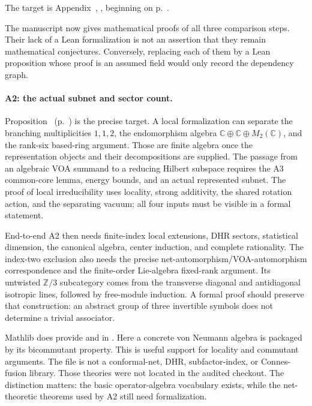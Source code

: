 The target is Appendix~,
\emph{}, beginning on
p.~.

The manuscript now gives mathematical proofs of all three comparison
steps. Their lack of a Lean formalization is not an assertion that they
remain mathematical conjectures. Conversely, replacing each of them
by a Lean proposition whose proof is an assumed field would only record
the dependency graph.

\paragraph{A2: the actual subnet and sector count.}
Proposition~
(p.~) is the precise target.
A local formalization can separate the branching multiplicities
$1,1,2$, the endomorphism algebra
$\mathbb C\oplus\mathbb C\oplus M_2(\mathbb C)$, and the rank-six
based-ring argument. Those are finite algebra once the representation
objects and their decompositions are supplied. The passage from an
algebraic VOA summand to a reducing Hilbert subspace requires the A3
common-core lemma, energy bounds, and an actual represented subnet.
The proof of local irreducibility uses locality, strong additivity,
the shared rotation action, and the separating vacuum; all four inputs
must be visible in a formal statement.

End-to-end A2 then needs finite-index local extensions, DHR sectors,
statistical dimension, the canonical algebra, center induction, and
complete rationality. The index-two exclusion also needs the precise
net-automorphism/VOA-automorphism correspondence and the finite-order
Lie-algebra fixed-rank argument. Its untwisted $\mathbb Z/3$ subcategory
comes from the transverse diagonal and antidiagonal isotropic lines,
followed by free-module induction. A formal proof should preserve that
construction: an abstract group of three invertible symbols does not
determine a trivial associator.

Mathlib does provide  and
 in
.
Here a concrete von Neumann algebra is packaged by its bicommutant
property. This is useful support for locality and commutant arguments.
The file is not a conformal-net, DHR, subfactor-index, or Connes-fusion
library. Those theories were not located in the audited checkout.
The distinction matters: the basic operator-algebra vocabulary exists,
while the net-theoretic theorems used by A2 still need formalization.

